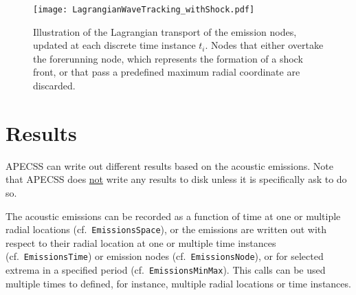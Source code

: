 \begin{figure}
    \begin{center}
    \texttt{[image: LagrangianWaveTracking\_withShock.pdf]}
    \caption{Illustration of the Lagrangian transport of the emission nodes, updated at each discrete time instance $t_i$. Nodes that either overtake the forerunning node, which represents the formation of a shock front, or that pass a predefined maximum radial coordinate are discarded.}
    \label{fig:lagrangiantrackingshock}
    \end{center}
\end{figure}


\section{Results}
\label{sec:emissions_results}

APECSS can write out different results based on the acoustic emissions. Note that APECSS does \uline{not} write any results to disk unless it is specifically ask to do so.

The acoustic emissions can be recorded as a function of time at one or multiple radial locations (cf.~{\tt EmissionsSpace}), or the emissions are written out with respect to their radial location at one or multiple time instances (cf.~{\tt EmissionsTime}) or emission nodes (cf.~{\tt EmissionsNode}), or for selected extrema in a specified period (cf.~{\tt EmissionsMinMax}). This calls can be used multiple times to defined, for instance, multiple radial locations or time instances.

\vspace{0.8em}

